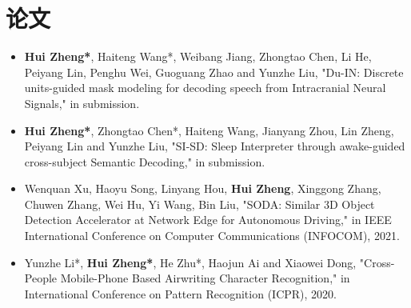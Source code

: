 \documentclass{resume}
\begin{document}
\section{{\bfseries 论文}}
\begin{itemize}[parsep=0.2ex]
  \item \textbf{Hui Zheng*}, Haiteng Wang*, Weibang Jiang, Zhongtao Chen, Li He, Peiyang Lin, Penghu Wei, Guoguang Zhao and Yunzhe Liu, "Du-IN: Discrete units-guided mask modeling for decoding speech from Intracranial Neural Signals," in submission.
  \item \textbf{Hui Zheng*}, Zhongtao Chen*, Haiteng Wang, Jianyang Zhou, Lin Zheng, Peiyang Lin and Yunzhe Liu, "SI-SD: Sleep Interpreter through awake-guided cross-subject Semantic Decoding," in submission.
  \item Wenquan Xu, Haoyu Song, Linyang Hou, \textbf{Hui Zheng}, Xinggong Zhang, Chuwen Zhang, Wei Hu, Yi Wang, Bin Liu, "SODA: Similar 3D Object Detection Accelerator at Network Edge for Autonomous Driving," in IEEE International Conference on Computer Communications (INFOCOM), 2021.
  \item Yunzhe Li*, \textbf{Hui Zheng*}, He Zhu*, Haojun Ai and Xiaowei Dong, "Cross-People Mobile-Phone Based Airwriting Character Recognition," in International Conference on Pattern Recognition (ICPR), 2020.
\end{itemize}

\end{document}
